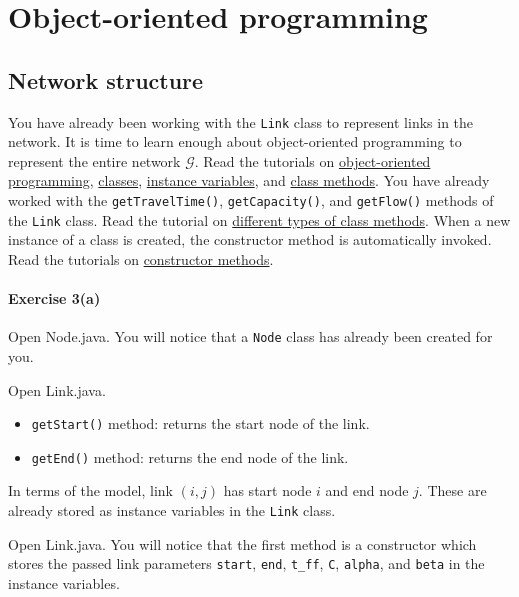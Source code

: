 \documentclass[11pt]{article}
\begin{document}
	
	
	
\section{Object-oriented programming}

\subsection{Network structure}

\label{sec31}
	
You have already been working with the \texttt{Link} class to represent links in the network. It is time to learn enough about object-oriented programming to represent the entire network $\mathcal{G}$. Read the tutorials on \href{https://www.w3schools.com/java/java_oop.asp}{object-oriented programming},  \href{https://www.w3schools.com/java/java_classes.asp}{classes}, \href{https://www.w3schools.com/java/java_class_attributes.asp}{instance variables}, and \href{https://www.w3schools.com/java/java_class_methods.asp}{class methods}. You have already worked with the \texttt{getTravelTime()}, \texttt{getCapacity()}, and \texttt{getFlow()} methods of the \texttt{Link} class. Read the tutorial on \href{https://www.w3schools.com/java/java_modifiers.asp}{different types of class methods}.
When a new instance of a class is created, the constructor method is automatically invoked. Read the tutorials on \href{https://www.w3schools.com/java/java_constructors.asp}{constructor methods}.
 
 
 \paragraph*{Exercise 3(a)} Open Node.java. You will notice that a \texttt{Node} class has already been created for you.
 
 Open Link.java. 
  \begin{itemize}
 	\item \texttt{getStart()} method: returns the start node of the link.
 	\item  \texttt{getEnd()} method: returns the end node of the link.
 \end{itemize} 
 In terms of the model, link $(i,j)$ has start node $i$ and end node $j$. These are already stored as instance variables in the \texttt{Link} class. 
 

Open Link.java. You will notice that the first method is a constructor which stores the passed link parameters \texttt{start}, \texttt{end}, \texttt{t\_ff}, \texttt{C}, \texttt{alpha}, and \texttt{beta} in the instance variables. 
\end{document}
